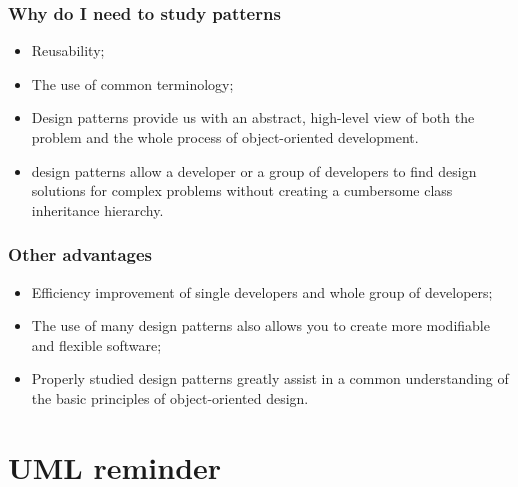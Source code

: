 \documentclass[10pt,xcolor={usenames,dvipsnames}]{beamer}
\begin{document}
\begin{frame}[fragile]
	\frametitle{Why do I need to study patterns}
	\begin{itemize}
		\item Reusability;
		\item The use of common terminology;
		\item Design patterns provide us with an abstract, high-level view of
		both the problem and the whole process of object-oriented development.
	\item design patterns allow a developer or a group of developers to find design solutions for complex problems without creating a cumbersome class inheritance hierarchy.
	\end{itemize}
\end{frame}

\begin{frame}[fragile]
	\frametitle{Other advantages}
	\begin{itemize}
		\item Efficiency improvement of single developers and whole group of developers;
		\item The use of many design patterns also allows you to create more modifiable and flexible software;
		\item Properly studied design patterns greatly assist in a common understanding of the basic principles of object-oriented design. 
	\end{itemize}
\end{frame}

\section{UML reminder}
\end{document}
